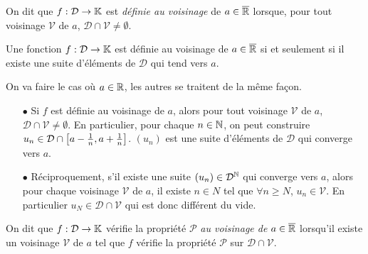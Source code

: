 \documentclass{magnolia}
\begin{document}
\begin{definition}[utile=-3]
On dit que $f:\mathcal{D}\to\mathbb{K}$ est \emph{définie au voisinage}
de $a\in\overline{\mathbb{R}}$ lorsque, pour tout voisinage $\mathcal{V}$ de $a$, $\mathcal{D}\cap\mathcal{V}\neq\emptyset$.
\end{definition}

\begin{proposition}[utile=-3]
Une fonction $f:\mathcal{D}\to\mathbb{K}$ est définie au voisinage de $a\in\overline{\mathbb{R}}$ si et seulement si il existe une
suite d'éléments de $\mathcal{D}$ qui tend vers $a$.
\end{proposition}

\begin{preuve}
On va faire le cas où $a\in \mathbb{R}$, les autres se traitent de la même façon.
\begin{itemize}
\item[$\bullet$] Si $f$ est définie au voisinage de $a$, alors pour tout voisinage $\mathcal{V}$ de $a$, $\mathcal{D}\cap\mathcal{V}\neq\emptyset$. En particulier, pour chaque $n\in \mathbb{N}$, on peut construire $u_n \in \mathcal{D}\cap \left[a-\frac{1}{n},a+\frac{1}{n}\right]$. $(u_n)$ est une suite d'éléments de $\mathcal{D}$ qui converge vers $a$.
\item[$\bullet$] Réciproquement, s'il existe une suite $(u_n) \in \mathcal{D}^{\mathbb{N}}$ qui converge vers $a$, alors pour chaque voisinage $\mathcal{V}$ de $a$, il existe $n\in N$ tel que $\forall n \geq N$, $u_n \in \mathcal{V}$. En particulier $u_N \in \mathcal{D}\cap\mathcal{V}$ qui est donc différent du vide.
\end{itemize}
\end{preuve}

\begin{definition}[utile=-3]
On dit que $f:\mathcal{D}\to\mathbb{K}$ vérifie la propriété $\mathcal{P}$ \emph{au voisinage de $a\in\overline{\mathbb{R}}$}
lorsqu'il existe un voisinage $\mathcal{V}$ de $a$ tel que $f$ vérifie la propriété $\mathcal{P}$ sur $\mathcal{D}\cap\mathcal{V}$.
\end{definition}
\end{document}
